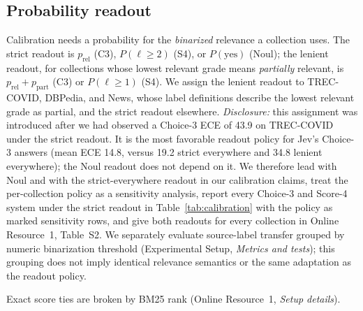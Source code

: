 \subsection{Probability readout}

Calibration needs a probability for the \emph{binarized} relevance a collection uses.
The strict readout is $p_\text{rel}$ (C3), $P(\ell\ge2)$ (S4), or $P(\text{yes})$ (Noul); the lenient readout, for collections whose lowest relevant grade means \emph{partially} relevant, is $p_\text{rel}+p_\text{part}$ (C3) or $P(\ell\ge1)$ (S4).
We assign the lenient readout to TREC-COVID, DBPedia, and News, whose label definitions describe the lowest relevant grade as partial, and the strict readout elsewhere.
\emph{Disclosure:} this assignment was introduced after we had observed a Choice-3 ECE of 43.9 on TREC-COVID under the strict readout. It is the most favorable readout policy for Jev's Choice-3 answers (mean ECE 14.8, versus 19.2 strict everywhere and 34.8 lenient everywhere); the Noul readout does not depend on it. We therefore lead with Noul and with the strict-everywhere readout in our calibration claims, treat the per-collection policy as a sensitivity analysis, report every Choice-3 and Score-4 system under the strict readout in Table~\ref{tab:calibration} with the policy as marked sensitivity rows, and give both readouts for every collection in Online Resource~1, Table~S2. We separately evaluate source-label transfer grouped by numeric binarization threshold (Experimental Setup, \emph{Metrics and tests}); this grouping does not imply identical relevance semantics or the same adaptation as the readout policy.

Exact score ties are broken by BM25 rank (Online Resource~1, \emph{Setup details}).
